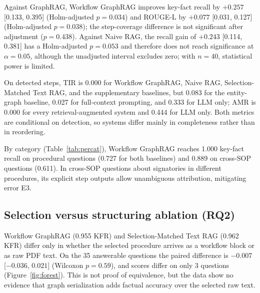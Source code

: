 \documentclass[preprint,10pt]{elsarticle}
\begin{document}
\begin{table}[!htbp]
\centering
\caption{Summary of evaluation results across ten system configurations. KFR and false refusal: 35 answerable questions; Coverage, TIR, and AMR: 11 procedural questions; refusal accuracy: 5 unanswerable questions; prompt tokens: all 40. Point estimates; confidence intervals are in the Supplementary Material (S1).}
\label{tab:results}
\small
\setlength{\tabcolsep}{2pt}
\resizebox{\textwidth}{!}{%
}
\end{table}

Against GraphRAG, Workflow GraphRAG improves key-fact recall by $+0.257$ [0.133, 0.395] (Holm-adjusted $p=0.034$) and ROUGE-L by $+0.077$ [0.031, 0.127] (Holm-adjusted $p=0.038$); the step-coverage difference is not significant after adjustment ($p=0.438$). Against Naive RAG, the recall gain of $+0.243$ [0.114, 0.381] has a Holm-adjusted $p=0.053$ and therefore does not reach significance at $\alpha=0.05$, although the unadjusted interval excludes zero; with $n=40$, statistical power is limited.

On detected steps, TIR is 0.000 for Workflow GraphRAG, Naive RAG, Selection-Matched Text RAG, and the supplementary baselines, but 0.083 for the entity-graph baseline, 0.027 for full-context prompting, and 0.333 for LLM only; AMR is 0.000 for every retrieval-augmented system and 0.444 for LLM only. Both metrics are conditional on detection, so systems differ mainly in completeness rather than in reordering.

By category (Table~\ref{tab:percat}), Workflow GraphRAG reaches 1.000 key-fact recall on procedural questions (0.727 for both baselines) and 0.889 on cross-SOP questions (0.611). In cross-SOP questions about signatories in different procedures, its explicit step outputs allow unambiguous attribution, mitigating error E3.

\begin{table}[!htbp]
\centering
\caption{Key-fact recall by question category for the primary comparison systems on \nVerified{} verified questions. Procedural category also includes step coverage.}
\label{tab:percat}
\small
\setlength{\tabcolsep}{4pt}
\resizebox{\textwidth}{!}{%
}
\end{table}

\subsection{Selection versus structuring ablation (RQ2)}
\label{sec:ablation-results}
Workflow GraphRAG (0.955 KFR) and Selection-Matched Text RAG (0.962 KFR) differ only in whether the selected procedure arrives as a workflow block or as raw PDF text. On the 35 answerable questions the paired difference is $-0.007$ [$-0.036$, $0.021$] (Wilcoxon $p=0.59$), and scores differ on only 3 questions (Figure~\ref{fig:forest}). This is not proof of equivalence, but the data show no evidence that graph serialization adds factual accuracy over the selected raw text.
\end{document}
